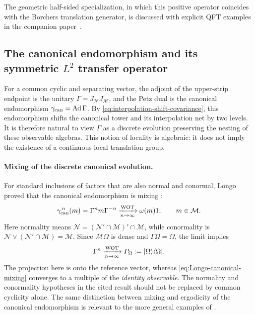 \documentclass[a4paper,11pt]{article}
\theoremstyle{definition}
\newcommand{\mN}{\mathcal{N}}
\newcommand{\mM}{\mathcal{M}}
\begin{document}
The geometric half-sided specialization, in which this positive operator
coincides with the Borchers translation generator, is discussed with explicit
QFT examples in the companion paper~\cite{companionQFT}.

\subsection{The canonical endomorphism and its symmetric $L^2$ transfer operator}
\label{subsec:emergent-transfer-time}

For a common cyclic and separating vector, the adjoint of the upper-strip
endpoint is the unitary $\Gamma=J_{\mN}J_{\mM}$, and the Petz dual is the
canonical endomorphism $\gamma_{\rm can}=\operatorname{Ad}\Gamma$.
By \eqref{eq:interpolation-shift-covariance}, this endomorphism shifts the
canonical tower and its interpolation net by two levels. It is therefore
natural to view $\Gamma$ as a discrete evolution preserving the nesting of
these observable algebras. This notion of locality is algebraic: it does
not imply the existence of a continuous local translation group.

\paragraph{Mixing of the discrete canonical evolution.}
For standard inclusions of factors that are also normal and conormal,
Longo proved that the canonical endomorphism is mixing
\cite{Longo1984FactorialStoneWeierstrass,Longo1985Pseudonormalcy}:
\begin{equation}
    \gamma_{\rm can}^{\,n}(m)
    =\Gamma^n m\Gamma^{-n}
    \xrightarrow[n\to\infty]{\rm WOT}
    \omega(m)1,\qquad m\in\mM.
    \label{eq:Longo-canonical-mixing}
\end{equation}
Here normality means $\mN=(\mN'\cap\mM)'\cap\mM$, while
conormality is $\mN\vee(\mN'\cap\mM)=\mM$. Since $\mM\Omega$
is dense and $\Gamma\Omega=\Omega$, the limit implies
\begin{equation}
    \Gamma^n\xrightarrow[n\to\infty]{\rm WOT}
    P_\Omega:=|\Omega\rangle\langle\Omega|.
    \label{eq:Longo-Gamma-weak}
\end{equation}
The projection here is onto the reference vector, whereas
\eqref{eq:Longo-canonical-mixing} converges to a multiple of the
\emph{identity observable}. The normality and conormality hypotheses
in the cited result should not be replaced by common cyclicity alone.
The same distinction between mixing and ergodicity of the canonical
endomorphism is relevant to the more general examples of
\cite{LongoTanimotoUeda2019}.
\end{document}
